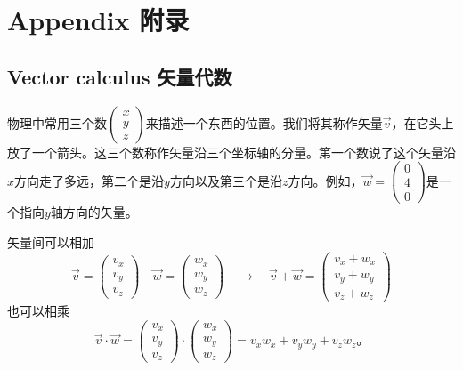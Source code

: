 
\appendix

\part{Appendix 附录}
\chapter[矢量代数]{Vector calculus 矢量代数}\label{appendix.A}
物理中常用三个数$ \begin{pmatrix}
x \\ y \\ z
\end{pmatrix}$来描述一个东西的位置。我们将其称作矢量$\vec{v}$，在它头上放了一个箭头。这三个数称作矢量沿三个坐标轴的分量。第一个数说了这个矢量沿$x$方向走了多远，第二个是沿$y$方向以及第三个是沿$z$方向。例如，$\vec{w}= \begin{pmatrix}
0 \\ 4 \\ 0
\end{pmatrix}$是一个指向$y$轴方向的矢量。


矢量间可以相加
\begin{equation}
\vec{v} = \begin{pmatrix}
v_x \\ v_y \\ v_z
\end{pmatrix} \quad
\vec{w} = \begin{pmatrix}
w_x \\ w_y \\ w_z
\end{pmatrix} \quad \rightarrow \quad
\vec{v}+\vec{w}= \begin{pmatrix}
v_x+w_x \\ v_y+w_y \\ v_z+w_z
\end{pmatrix}
\end{equation}
也可以相乘
\begin{equation}
\vec{v}\cdot\vec{w} = \begin{pmatrix}
v_x \\ v_y \\ v_z
\end{pmatrix} \cdot \begin{pmatrix}
w_x \\ w_y \\ w_z
\end{pmatrix} =
v_xw_x +v_yw_y +v_zw_z\text{。}
\end{equation}

